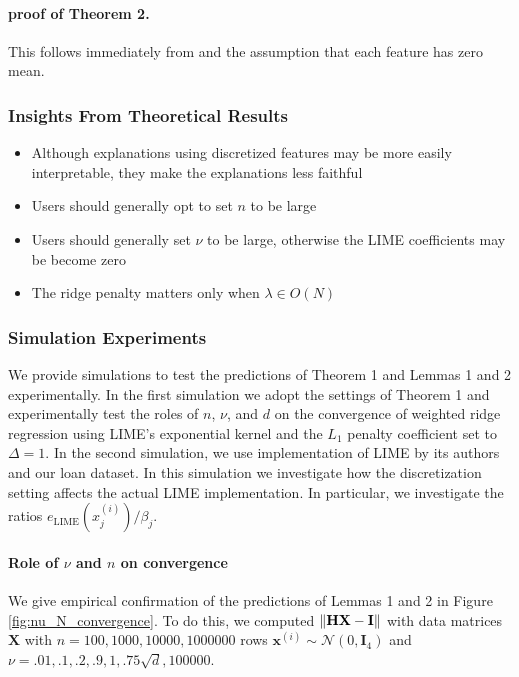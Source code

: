 \documentclass[mnsc,blindrev]{informs3}
\begin{document}
            
        \paragraph{proof of Theorem 2.}
            This follows immediately from \citep{StrumbeljErik2014Epma} and the assumption that each feature has zero mean.
    
        \subsubsection{Insights From Theoretical Results}
            \begin{itemize}
                \item Although explanations using discretized features may be more easily interpretable, they make the explanations less faithful
                \item Users should generally opt to set $n$ to be large 
                \item Users should generally set $\nu$ to be large, otherwise the LIME coefficients may be become zero
                \item The ridge penalty matters only when $\lambda \in O(N)$
            \end{itemize}
    
            \subsubsection{Simulation Experiments}
                \label{sec:simulation_experiments}
                We provide simulations to test the predictions of Theorem 1 and Lemmas 1 and 2 experimentally. In the first simulation we adopt the settings of Theorem 1 and experimentally test the roles of $n$, $\nu$, and $d$ on the convergence of weighted ridge regression using LIME's exponential kernel and the $L_1$ penalty coefficient set to $\Delta=1$. In the second simulation, we use implementation of LIME by its authors and our loan dataset. In this simulation we investigate how the discretization setting affects the actual LIME implementation. In particular, we investigate the ratios $e_{\text{LIME}}(x^{(i)}_j)/\beta_j$. 
    

    
                \paragraph{Role of $\nu$ and $n$ on convergence}
                    We give empirical confirmation of the predictions of Lemmas 1 and 2 in Figure \ref{fig:nu_N_convergence}. To do this, we computed $\norm{\mathbf{H}\mathbf{X} - \mathbf{I}}$ with data matrices $\mathbf{X}$ with $n=100,1000,10000,1000000$ rows  $\mathbf{x}^{(i)} \sim \mathcal{N}(0,\mathbf{I}_4)$ and $\nu=.01,.1,.2,.9,1,.75\sqrt{d},100000$. 
    
\end{document}
